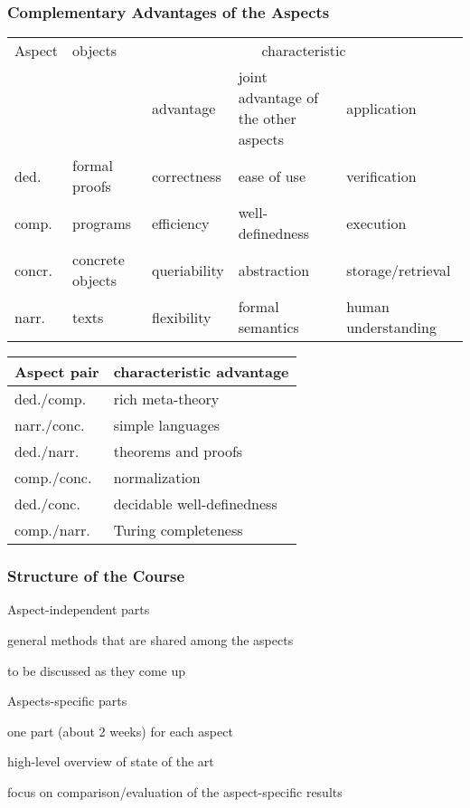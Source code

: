 \begin{frame}\frametitle{Complementary Advantages of the Aspects}
\begin{center}
\footnotesize
\begin{tabular}{|l|llp{2.1cm}l|}\hline
Aspect & objects & \multicolumn{3}{c|}{characteristic} \\
       &         & advantage & joint advantage of the other aspects & application \\\hline
ded. & formal proofs & correctness & ease of use & verification \\
comp. & programs & efficiency & well-definedness & execution\\
concr. & concrete objects & queriability & abstraction & storage/retrieval\\
narr. & texts & flexibility & formal semantics & human understanding\\\hline
\end{tabular}
\medskip

\begin{tabular}{|l|l|}\hline
Aspect pair & characteristic advantage \\\hline
ded./comp.  & rich meta-theory \\
narr./conc. & simple languages \\\hline
ded./narr.  & theorems and proofs \\
comp./conc. & normalization \\\hline
ded./conc.  & decidable well-definedness \\
comp./narr. & Turing completeness \\\hline
\end{tabular}
\end{center}
\end{frame}

\begin{frame}\frametitle{Structure of the Course}
\begin{blockitems}{Aspect-independent parts}
\item general methods that are shared among the aspects
\item to be discussed as they come up
\end{blockitems}

\begin{blockitems}{Aspects-specific parts}
\item one part (about 2 weeks) for each aspect
\item high-level overview of state of the art
\item focus on comparison/evaluation of the aspect-specific results
\end{blockitems}
\end{frame}

